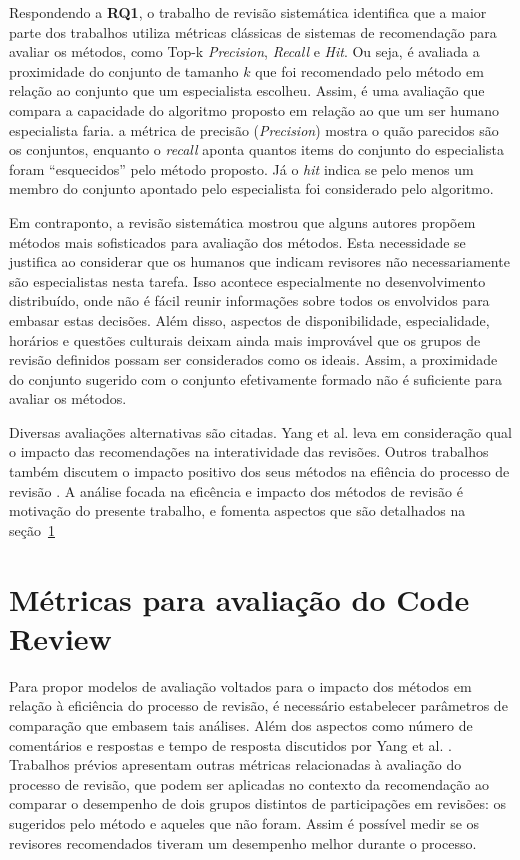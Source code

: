 \documentclass[12pt,openany,oneside,a4paper,english,brazil]{abntbibufjf}
\begin{document}
Respondendo a \textbf{RQ1}, o trabalho de revisão sistemática identifica que a maior parte dos trabalhos utiliza métricas clássicas de sistemas de recomendação para avaliar os métodos, como Top-k \textit{Precision}, \textit{Recall} e \textit{Hit}. Ou seja, é avaliada a proximidade do conjunto de tamanho $k$ que foi recomendado pelo método em relação ao conjunto que um especialista escolheu. Assim, é uma avaliação que compara a capacidade do algoritmo proposto em relação ao que um ser humano especialista faria. a métrica de precisão (\textit{Precision}) mostra o quão parecidos são os conjuntos, enquanto o \textit{recall} aponta quantos items do conjunto do especialista foram ``esquecidos'' pelo método proposto. Já o \textit{hit} indica se pelo menos um membro do conjunto apontado pelo especialista foi considerado pelo algoritmo.

Em contraponto, a revisão sistemática mostrou que alguns autores propõem métodos mais sofisticados para avaliação dos métodos. Esta necessidade se justifica ao considerar que os humanos que indicam revisores não necessariamente são especialistas nesta tarefa. Isso acontece especialmente no desenvolvimento distribuído, onde não é fácil reunir informações sobre todos os envolvidos para embasar estas decisões. Além disso, aspectos de disponibilidade, especialidade, horários e questões culturais deixam ainda mais improvável que os grupos de revisão definidos possam ser considerados como os ideais. Assim, a proximidade do conjunto sugerido com o conjunto efetivamente formado não é suficiente para avaliar os métodos.

Diversas avaliações alternativas são citadas. Yang et al. \cite{yang2016} leva em consideração qual o impacto das recomendações na interatividade das revisões. Outros trabalhos também discutem o impacto positivo dos seus métodos na efiência do processo de revisão \cite{xia2017, liao2017}. A análise focada na eficência e impacto dos métodos de revisão é motivação do presente trabalho, e fomenta aspectos que são detalhados na seção~\ref{sec:avaliacao_review}

\section{Métricas para avaliação do Code Review}\label{sec:avaliacao_review}

Para propor modelos de avaliação voltados para o impacto dos métodos em relação à eficiência do processo de revisão, é necessário estabelecer parâmetros de comparação que embasem tais análises. Além dos aspectos como número de comentários e respostas e tempo de resposta discutidos por Yang et al. \cite{yang2016}. Trabalhos prévios apresentam outras métricas relacionadas à avaliação do processo de revisão, que podem ser aplicadas no contexto da recomendação ao comparar o desempenho de dois grupos distintos de participações em revisões: os sugeridos pelo método e aqueles que não foram. Assim é possível medir se os revisores recomendados tiveram um desempenho melhor durante o processo.
\end{document}
